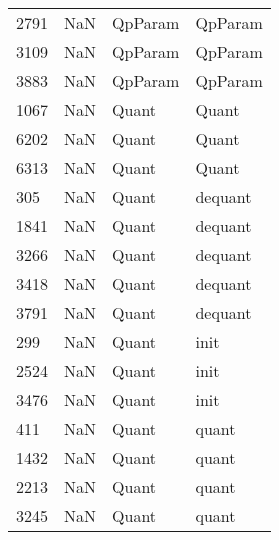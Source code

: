 \begin{tabular}{llll}
2791 &                   NaN &                    QpParam &                                   QpParam \\
3109 &                   NaN &                    QpParam &                                   QpParam \\
3883 &                   NaN &                    QpParam &                                   QpParam \\
1067 &                   NaN &                      Quant &                                     Quant \\
6202 &                   NaN &                      Quant &                                     Quant \\
6313 &                   NaN &                      Quant &                                     Quant \\
305  &                   NaN &                      Quant &                                   dequant \\
1841 &                   NaN &                      Quant &                                   dequant \\
3266 &                   NaN &                      Quant &                                   dequant \\
3418 &                   NaN &                      Quant &                                   dequant \\
3791 &                   NaN &                      Quant &                                   dequant \\
299  &                   NaN &                      Quant &                                      init \\
2524 &                   NaN &                      Quant &                                      init \\
3476 &                   NaN &                      Quant &                                      init \\
411  &                   NaN &                      Quant &                                     quant \\
1432 &                   NaN &                      Quant &                                     quant \\
2213 &                   NaN &                      Quant &                                     quant \\
3245 &                   NaN &                      Quant &                                     quant \\

\end{tabular}
